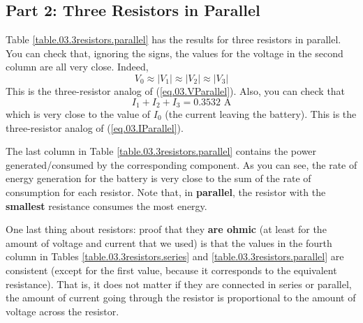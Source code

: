 \subsection{Part 2: Three Resistors in Parallel}
Table \ref{table.03.3resistors.parallel} has the results for three resistors in parallel. You can check that, ignoring the signs, the values for the voltage in the second column are all very close. Indeed,
\begin{equation}
	V_{0} \approx |V_{1}| \approx |V_{2}| \approx |V_{3}|
\end{equation}
This is the three-resistor analog of (\ref{eq.03.VParallel}). Also, you can check that
\begin{equation}
	I_{1} + I_{2} + I_{3}  = 0.3532 \text{ A}
\end{equation}
which is very close to the value of $I_{0}$ (the current leaving the battery). This is the three-resistor analog of (\ref{eq.03.IParallel}).

The last column in Table \ref{table.03.3resistors.parallel} contains the power generated/consumed by the corresponding component. As you can see, the rate of energy generation for the battery is very close to the sum of the rate of consumption for each resistor. Note that, in \textbf{parallel}, the resistor with the \textbf{smallest} resistance consumes the most energy.

One last thing about resistors: proof that they \textbf{are ohmic} (at least for the amount of voltage and current that we used) is that the values in the fourth column in Tables \ref{table.03.3resistors.series} and \ref{table.03.3resistors.parallel} are consistent (except for the first value, because it corresponds to the equivalent resistance). That is, it does not matter if they are connected in series or parallel, the amount of current going through the resistor is proportional to the amount of voltage across the resistor.
